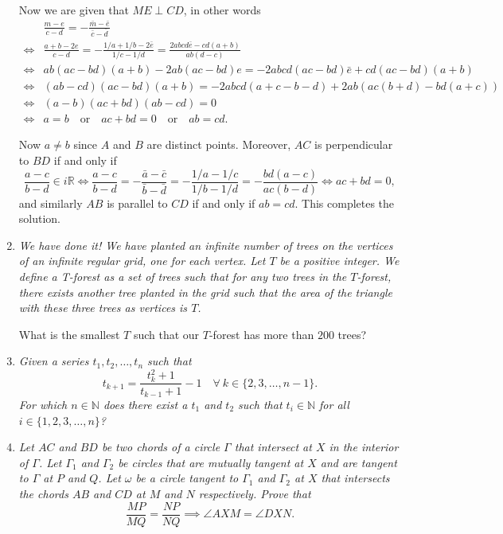 \documentclass{article}
\begin{document}
\begin{enumerate}
Now we are given that $ME \perp CD$, in other words
\begin{align*}
	     & \frac{m-e}{c-d} = -\frac{\bar{m}-\bar{e}}{\bar{c}-\bar{d}} \\
	\iff & \frac{a+b-2e}{c-d} = -\frac{1/a+1/b-2\bar{e}}{1/c-1/d} = \frac{2abcd\bar{e}-cd(a+b)}{ab(d-c)} \\
	\iff & ab(ac-bd)(a+b)-2ab(ac-bd)e = -2abcd(ac-bd)\bar{e} +cd(ac-bd)(a+b) \\
	\iff & (ab-cd)(ac-bd)(a+b) = -2abcd(a+c-b-d) +2ab(ac(b+d)-bd(a+c)) \\
	\iff & (a-b)(ac+bd)(ab-cd) = 0 \\
	\iff & a = b \quad \text{or} \quad ac+bd = 0 \quad \text{or} \quad ab = cd.
\end{align*}

Now $a \neq b$ since $A$ and $B$ are distinct points.
Moreover, $AC$ is perpendicular to $BD$ if and only if
\[ \frac{a-c}{b-d} \in i\mathbb{R} \iff \frac{a-c}{b-d} = -\frac{\bar{a}-\bar{c}}{\bar{b}-\bar{d}} = -\frac{1/a-1/c}{1/b-1/d} = -\frac{bd(a-c)}{ac(b-d)} \iff ac+bd = 0, \]
and similarly $AB$ is parallel to $CD$ if and only if $ab = cd$.
This completes the solution.


\medskip
\item %
{\itshape We have done it! We have planted an infinite number of trees on the vertices of an infinite regular grid, one for each vertex. Let $T$ be a positive integer. 
We define a {\itshape T-forest} as a set of trees such that for any two trees in the $T$-forest, there exists another tree planted in the grid such that the area of the triangle with these three trees as vertices is $T$.

What is the smallest $T$ such that our $T$-forest has more than $200$ trees?}



\medskip
\item %
{\itshape Given a series $t_1, t_2, \dotsc, t_n$ such that 
\[ t_{k + 1} = \frac{t_k^2 + 1}{t_{k-1} + 1} - 1 \quad \forall \ k \in \{2, 3, \dots, n-1\}. \]
For which $n \in \mathbb{N}$ does there exist a $t_1$ and $t_2$ such that $t_i \in \mathbb{N}$ for all $i \in \{1, 2, 3, \dotsc, n\}$?}



\medskip
\item %
{\itshape Let $AC$ and $BD$ be two chords of a circle $\Gamma$ that intersect at $X$ in the interior of $\Gamma$.
Let $\Gamma_1$ and $\Gamma_2$ be circles that are mutually tangent at $X$ and are tangent to $\Gamma$ at $P$ and $Q$.
Let $\omega$ be a circle tangent to $\Gamma_1$ and $\Gamma_2$ at $X$ that intersects the chords $AB$ and $CD$ at $M$ and $N$ respectively.
Prove that
\[
	\frac{MP}{MQ} = \frac{NP}{NQ} \implies \angle AXM = \angle DXN.
\]}




\end{enumerate}
\end{document}
